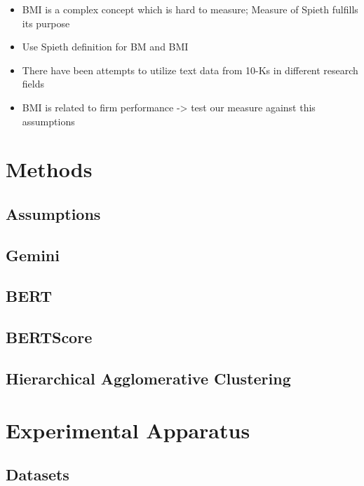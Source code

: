 \documentclass[manuscript,screen,review]{acmart}
\providecommand{\tightlist}{%
  \setlength{\itemsep}{0pt}\setlength{\parskip}{0pt}}\usepackage{longtable,booktabs,array}
\begin{document}
\begin{itemize}
\tightlist
\item
  BMI is a complex concept which is hard to measure; Measure of Spieth
  fulfills its purpose
\item
  Use Spieth definition for BM and BMI
\item
  There have been attempts to utilize text data from 10-Ks in different
  research fields
\item
  BMI is related to firm performance -\textgreater{} test our measure
  against this assumptions
\end{itemize}

\section{Methods}\label{methods}

\subsection{Assumptions}\label{assumptions}

\subsection{Gemini}\label{gemini}

\subsection{BERT}\label{bert}

\subsection{BERTScore}\label{bertscore}

\subsection{Hierarchical Agglomerative
Clustering}\label{hierarchical-agglomerative-clustering}

\section{Experimental Apparatus}\label{experimental-apparatus}

\subsection{Datasets}\label{datasets}
\end{document}
